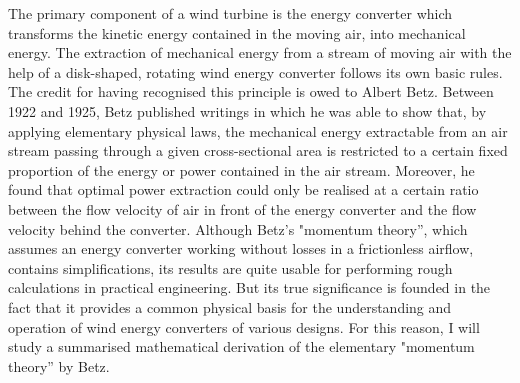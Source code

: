 %
%
%
%
%


The primary component of a wind turbine is the energy converter which transforms the kinetic energy contained in the moving air, into mechanical energy. The extraction of mechanical energy from a stream of moving air with the help of a disk-shaped, rotating wind energy converter follows its own basic rules. 
The credit for having recognised this principle is owed to Albert Betz. Between 1922 and 1925, Betz published writings in which he was able to show that, by applying elementary physical laws, the mechanical energy extractable from an air stream passing through a given cross-sectional area is restricted to a certain fixed proportion of the energy or power contained in the air stream. Moreover, he found that optimal power extraction could only be realised at a certain ratio between the flow velocity of air in front of the energy converter and the flow velocity behind the converter.
Although Betz’s "momentum theory”, which assumes an energy converter working without losses in a frictionless airflow, contains simplifications, its results are quite usable for performing rough calculations in practical engineering. But its true significance is founded in the fact that it provides a common physical basis for the understanding and operation of wind energy converters of various designs. For this reason, I will study a summarised mathematical derivation of the elementary "momentum theory” by Betz. 

